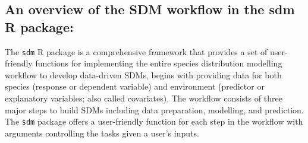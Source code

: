 \documentclass[
]{article}
\begin{document}
\subsection{An overview of the SDM workflow in the sdm R
package:}\label{an-overview-of-the-sdm-workflow-in-the-sdm-r-package}

The \texttt{sdm} R package is a comprehensive framework that provides a
set of user-friendly functions for implementing the entire species
distribution modelling workflow to develop data-driven SDMs, begins with
providing data for both species (response or dependent variable) and
environment (predictor or explanatory variables; also called
covariates). The workflow consists of three major steps to build SDMs
including data preparation, modelling, and prediction. The \texttt{sdm}
package offers a user-friendly function for each step in the workflow
with arguments controlling the tasks given a user's inputs.
\end{document}
